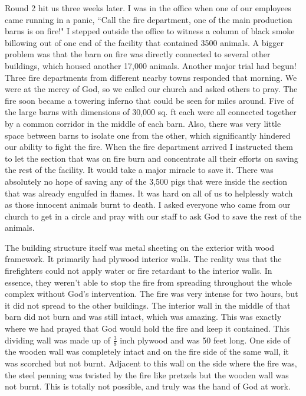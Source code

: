 \documentclass[oneside]{book}
\begin{document}
Round 2 hit us three weeks later. I was in the office when one of our employees came running in a panic, ``Call the fire department, one of the main production barns is on fire!" I stepped outside the office to witness a column of black smoke billowing out of one end of the facility that contained 3500 animals. A bigger problem was that the barn on fire was directly connected to several other buildings, which housed another 17,000 animals. Another major trial had begun! Three fire departments from different nearby towns responded that morning. We were at the mercy of God, so we called our church and asked others to pray. The fire soon became a towering inferno that could be seen for miles around. Five of the large barns with dimensions of 30,000 sq. ft each were all connected together by a common corridor in the middle of each barn. Also, there was very little space between barns to isolate one from the other, which significantly hindered our ability to fight the fire. When the fire department arrived I instructed them to let the section that was on fire burn and concentrate all their efforts on saving the rest of the facility. It would take a major miracle to save it. There was absolutely no hope of saving any of the 3,500 pigs that were inside the section that was already engulfed in flames. It was hard on all of us to helplessly watch as those innocent animals burnt to death. I asked everyone who came from our church to get in a circle and pray with our staff to ask God to save the rest of the animals.

The building structure itself was metal sheeting on the exterior with wood framework. It primarily had plywood interior walls. The reality was that the firefighters could not apply water or fire retardant to the interior walls. In essence, they weren't able to stop the fire from spreading throughout the whole complex without God's intervention. The fire was very intense for two hours, but it did not spread to the other buildings. The interior wall in the middle of that barn did not burn and was still intact, which was amazing. This was exactly where we had prayed that God would hold the fire and keep it contained. This dividing wall was made up of $\frac{3}{8}$ inch plywood and was 50 feet long. One side of the wooden wall was completely intact and on the fire side of the same wall, it was scorched but not burnt. Adjacent to this wall on the side where the fire was, the steel penning was twisted by the fire like pretzels but the wooden wall was not burnt. This is totally not possible, and truly was the hand of God at work.
\end{document}
